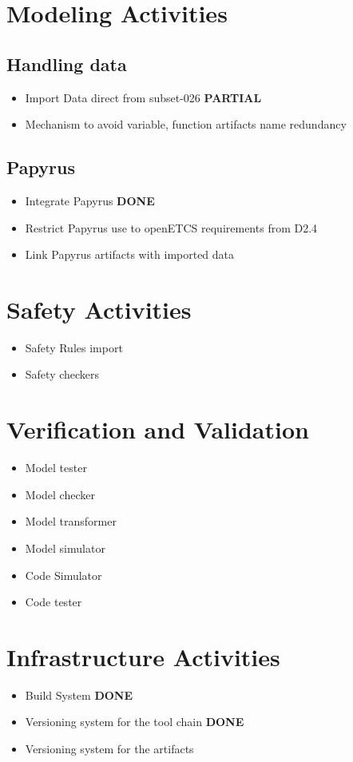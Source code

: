\documentclass{openetcs_report}
\begin{document}
\section{Modeling Activities}
\label{sec-2-Model}

\subsection{Handling data}
\begin{itemize}
\item Import Data direct from subset-026 {\bf PARTIAL}
\item Mechanism to avoid variable, function artifacts name redundancy
\end{itemize}

\subsection{Papyrus}
\begin{itemize}
\item Integrate Papyrus {\bf DONE}
\item Restrict Papyrus use to openETCS requirements from D2.4
\item Link Papyrus artifacts with imported data
\end{itemize}

\section{Safety Activities}
\begin{itemize}
\item Safety Rules import
\item Safety checkers
\end{itemize}

\section{Verification and Validation}
\begin{itemize}
\item Model tester
\item Model checker
\item Model transformer
\item Model simulator
\item Code Simulator
\item Code tester
\end{itemize}

\section{Infrastructure Activities}
\label{sec-2-infrastructure}
\begin{itemize}
\item Build System {\bf DONE}
\item Versioning system  for the tool chain {\bf DONE}
\item Versioning system for the artifacts
\end{itemize}
\end{document}
